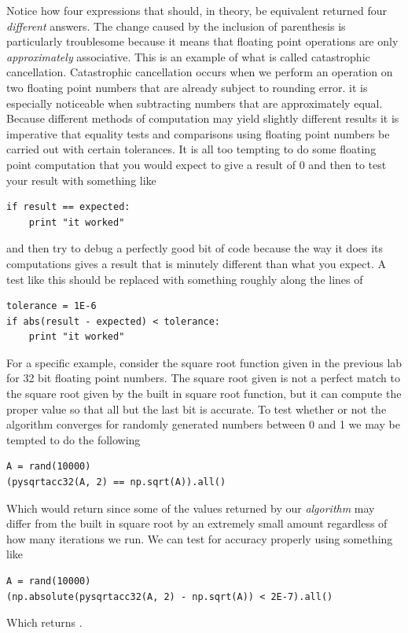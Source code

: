 Notice how four expressions that should, in theory, be equivalent returned four \emph{different} answers.
The change caused by the inclusion of parenthesis is particularly troublesome because it means that floating point operations are only \emph{approximately} associative.
This is an example of what is called catastrophic cancellation.
Catastrophic cancellation occurs when we perform an operation on two floating point numbers that are already subject to rounding error.
it is especially noticeable when subtracting numbers that are approximately equal.
Because different methods of computation may yield slightly different results it is imperative that equality tests and comparisons using floating point numbers be carried out with certain tolerances.
It is all too tempting to do some floating point computation that you would expect to give a result of 0 and then to test your result with something like
\begin{lstlisting}
if result == expected:
    print "it worked"
\end{lstlisting}
and then try to debug a perfectly good bit of code because the way it does its computations gives a result that is minutely different than what you expect.
A test like this should be replaced with something roughly along the lines of
\begin{lstlisting}
tolerance = 1E-6
if abs(result - expected) < tolerance:
    print "it worked"
\end{lstlisting}
For a specific example, consider the square root function given in the previous lab for 32 bit floating point numbers.
The square root given is not a perfect match to the square root given by the built in square root function, but it can compute the proper value so that all but the last bit is accurate.
To test whether or not the algorithm converges for randomly generated numbers between 0 and 1 we may be tempted to do the following
\begin{lstlisting}
A = rand(10000)
(pysqrtacc32(A, 2) == np.sqrt(A)).all()
\end{lstlisting}
Which would return  since some of the values returned by our \emph{algorithm} may differ from the built in square root by an extremely small amount regardless of how many iterations we run.
We can test for accuracy properly using something like
\begin{lstlisting}
A = rand(10000)
(np.absolute(pysqrtacc32(A, 2) - np.sqrt(A)) < 2E-7).all()
\end{lstlisting}
Which returns .


